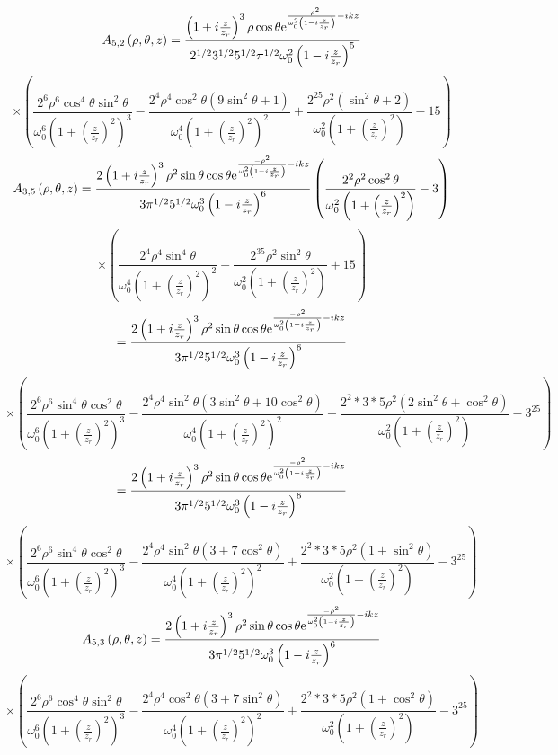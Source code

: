 \documentclass[11pt]{amsart}
\makeatletter
\newcommand{\e}{{\rm e}}				%
\newcommand{\0}{\varnothing}		%
\newcommand{\1}{!}
\newcommand{\2}{@}
\newcommand{\3}{\#}
\newcommand{\4}{\$}
\newcommand{\5}{\%}
\newcommand{\6}{$^\wedge$}
\newcommand{\7}{\&}
\newcommand{\8}{*}
\newcommand{\9}{(}
\makeatother
\begin{document}
\[
A_{5,2} \left(\rho,\theta,z\right) = \frac{\left(1+i\frac{z}{z_r}\right)^3\rho \cos \theta\e^{\frac{-\rho^2}{\omega_0^2\left(1-i\frac{z}{z_r}\right)}-ikz}}{2^{1/2}3^{1/2}5^{1/2}\pi^{1/2}\omega_0^2\left(1-i\frac{z}{z_r}\right)^5}
\]
\[
\times\left(\frac{2^6\rho^6\cos^4\theta \sin^2\theta}{\omega_0^6\left(1+\left(\frac{z}{z_r}\right)^2\right)^3}-\frac{2^4\rho^4\cos^2\theta\left(9\sin^2\theta+1\right)}{\omega_0^4\left(1+\left(\frac{z}{z_r}\right)^2\right)^2}+\frac{2^25\rho^2\left(\sin^2\theta + 2\right)}{\omega_0^2\left(1+\left(\frac{z}{z_r}\right)^2\right)}-15\right)
\]
\[
A_{3,5}\left(\rho,\theta,z\right) = \frac{2\left(1+i\frac{z}{z_r}\right)^3\rho^2\sin\theta\cos \theta\e^{\frac{-\rho^2}{\omega_0^2\left(1-i\frac{z}{z_r}\right)}-ikz}}{3\pi^{1/2}5^{1/2}\omega_0^3\left(1-i\frac{z}{z_r}\right)^6}\left(\frac{2^2\rho^2\cos^2\theta}{\omega_0^2\left(1+\left(\frac{z}{z_r}\right)^2\right)}-3\right)
\]
\[
\times\left(\frac{2^4\rho^4\sin^4\theta}{\omega_0^4\left(1+\left(\frac{z}{z_r}\right)^2\right)^2}-\frac{2^35\rho^2\sin^2\theta}{\omega_0^2\left(1+\left(\frac{z}{z_r}\right)^2\right)}+15\right)
\]
\[
=\frac{2\left(1+i\frac{z}{z_r}\right)^3\rho^2\sin\theta\cos \theta\e^{\frac{-\rho^2}{\omega_0^2\left(1-i\frac{z}{z_r}\right)}-ikz}}{3\pi^{1/2}5^{1/2}\omega_0^3\left(1-i\frac{z}{z_r}\right)^6}
\]
\[
\times\left(\frac{2^6\rho^6\sin^4\theta\cos^2\theta}{\omega_0^6\left(1+\left(\frac{z}{z_r}\right)^2\right)^3}-\frac{2^4\rho^4\sin^2\theta\left(3\sin^2\theta+10\cos^2\theta\right)}{\omega_0^4\left(1+\left(\frac{z}{z_r}\right)^2\right)^2}+\frac{2^2*3*5\rho^2\left(2\sin^2\theta+\cos^2\theta\right)}{\omega_0^2\left(1+\left(\frac{z}{z_r}\right)^2\right)}-3^25\right)
\]
\[
=\frac{2\left(1+i\frac{z}{z_r}\right)^3\rho^2\sin\theta\cos \theta\e^{\frac{-\rho^2}{\omega_0^2\left(1-i\frac{z}{z_r}\right)}-ikz}}{3\pi^{1/2}5^{1/2}\omega_0^3\left(1-i\frac{z}{z_r}\right)^6}
\]
\[
\times\left(\frac{2^6\rho^6\sin^4\theta\cos^2\theta}{\omega_0^6\left(1+\left(\frac{z}{z_r}\right)^2\right)^3}-\frac{2^4\rho^4\sin^2\theta\left(3+ 7\cos^2\theta\right)}{\omega_0^4\left(1+\left(\frac{z}{z_r}\right)^2\right)^2}+\frac{2^2*3*5\rho^2\left(1+\sin^2\theta\right)}{\omega_0^2\left(1+\left(\frac{z}{z_r}\right)^2\right)}-3^25\right)
\]
\[
A_{5,3}\left(\rho,\theta,z\right) =\frac{2\left(1+i\frac{z}{z_r}\right)^3\rho^2\sin\theta\cos \theta\e^{\frac{-\rho^2}{\omega_0^2\left(1-i\frac{z}{z_r}\right)}-ikz}}{3\pi^{1/2}5^{1/2}\omega_0^3\left(1-i\frac{z}{z_r}\right)^6}
\]
\[
\times\left(\frac{2^6\rho^6\cos^4\theta\sin^2\theta}{\omega_0^6\left(1+\left(\frac{z}{z_r}\right)^2\right)^3}-\frac{2^4\rho^4\cos^2\theta\left(3+ 7\sin^2\theta\right)}{\omega_0^4\left(1+\left(\frac{z}{z_r}\right)^2\right)^2}+\frac{2^2*3*5\rho^2\left(1+\cos^2\theta\right)}{\omega_0^2\left(1+\left(\frac{z}{z_r}\right)^2\right)}-3^25\right)
\]
\end{document}
